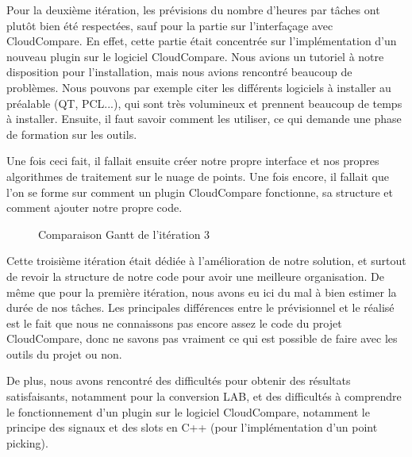 \documentclass[12pt,titlepage,french]{article}
\begin{document}
Pour la deuxième itération, les prévisions du nombre d'heures par tâches ont plutôt bien été respectées, sauf pour la partie sur l'interfaçage avec CloudCompare. En effet, cette partie était concentrée sur l'implémentation d'un nouveau plugin sur le logiciel CloudCompare. Nous avions un tutoriel à notre disposition pour l'installation, mais nous avions rencontré beaucoup de problèmes. Nous pouvons par exemple citer les différents logiciels à installer au préalable (QT, PCL...), qui sont très volumineux et prennent beaucoup de temps à installer. Ensuite, il faut savoir comment les utiliser, ce qui demande une phase de formation sur les outils. \newline

Une fois ceci fait, il fallait ensuite créer notre propre interface et nos propres algorithmes de traitement sur le nuage de points. Une fois encore, il fallait que l'on se forme sur comment un plugin CloudCompare fonctionne, sa structure et comment ajouter notre propre code.

\begin{figure}[!hbtp]
    \caption{\label{} Comparaison Gantt de l'itération 3}
\end{figure}

Cette troisième itération était dédiée à l'amélioration de notre solution, et surtout de revoir la structure de notre code pour avoir une meilleure organisation. De même que pour la première itération, nous avons eu ici du mal à bien estimer la durée de nos tâches. Les principales différences entre le prévisionnel et le réalisé est le fait que nous ne connaissons pas encore assez le code du projet CloudCompare, donc ne savons pas vraiment ce qui est possible de faire avec les outils du projet ou non. \newline

De plus, nous avons rencontré des difficultés pour obtenir des résultats satisfaisants, notamment pour la conversion LAB, et des difficultés à comprendre le fonctionnement d'un plugin sur le logiciel CloudCompare, notamment le principe des signaux et des slots en C++ (pour l'implémentation d'un point picking). \newline
\end{document}
